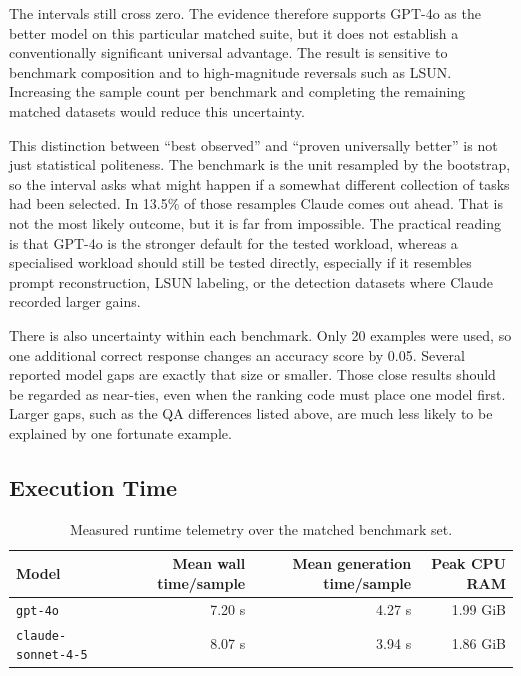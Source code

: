 ﻿\documentclass[11pt,a4paper]{article}
\begin{document}
The intervals still cross zero. The evidence therefore supports GPT-4o as
the better model on this particular matched suite, but it does not establish
a conventionally significant universal advantage. The result is sensitive
to benchmark composition and to high-magnitude reversals such as LSUN.
Increasing the sample count per benchmark and completing the remaining
matched datasets would reduce this uncertainty.

This distinction between ``best observed'' and ``proven universally better''
is not just statistical politeness. The benchmark is the unit resampled by
the bootstrap, so the interval asks what might happen if a somewhat different
collection of tasks had been selected. In 13.5\% of those resamples Claude
comes out ahead. That is not the most likely outcome, but it is far from
impossible. The practical reading is that GPT-4o is the stronger default for
the tested workload, whereas a specialised workload should still be tested
directly, especially if it resembles prompt reconstruction, LSUN labeling,
or the detection datasets where Claude recorded larger gains.

There is also uncertainty within each benchmark. Only 20 examples were used,
so one additional correct response changes an accuracy score by 0.05. Several
reported model gaps are exactly that size or smaller. Those close results
should be regarded as near-ties, even when the ranking code must place one
model first. Larger gaps, such as the QA differences listed above, are much
less likely to be explained by one fortunate example.

\subsection{Execution Time}

\begin{table}[H]
\centering
\small
\caption{Measured runtime telemetry over the matched benchmark set.}
\label{tab:gpt4o-claude-runtime}
\begin{tabularx}{\textwidth}{@{}Xrrr@{}}
\toprule
\textbf{Model} & \textbf{Mean wall time/sample} &
\textbf{Mean generation time/sample} & \textbf{Peak CPU RAM} \\
\midrule
\texttt{gpt-4o} & 7.20 s & 4.27 s & 1.99 GiB \\
\texttt{claude-sonnet-4-5} & 8.07 s & 3.94 s & 1.86 GiB \\
\bottomrule
\end{tabularx}
\end{table}
\end{document}
